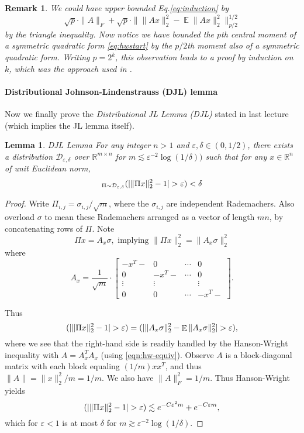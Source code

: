 \documentclass[11pt]{article}
\DeclareMathOperator*{\E}{\mathbb{E}}
\let\Pr\relax
\DeclareMathOperator*{\Pr}{\mathbb{P}}
\newcommand{\eps}{\varepsilon}
\newcommand{\R}{\mathbb{R}}
\newtheorem{remark}{Remark}
\newtheorem{lemma}[theorem]{Lemma}
\newcommand{\EquationName}[1]{\label{eq:#1}}
\newcommand{\Equation}[1]{Eq.\:\eqref{eq:#1}}
\newcommand{\Eqsub}[1]{\eqref{eq:#1}}
\begin{document}
\begin{remark}
\textup{
We could have upper bounded \Equation{induction} by 
$$
\sqrt{p}\cdot \|A\|_F + \sqrt{p}\cdot \| \|Ax\|_2^2 - \E\|Ax\|_2^2\|_{p/2}^{1/2}
$$
by the triangle inequality. Now notice we have bounded the $p$th central moment of a symmetric quadratic form \Eqsub{hwstart} by the $p/2$th moment also of a symmetric quadratic form. Writing $p = 2^k$, this observation leads to a proof by induction on $k$, which was the approach used in \cite{DiakonikolasKN10}.
}
\end{remark}

\paragraph{Distributional Johnson-Lindenstrauss (DJL) lemma}

Now we finally prove the {\it Distributional JL Lemma (DJL)} stated in last lecture (which implies the JL lemma itself).

\begin{lemma}{DJL Lemma}
For any integer $n > 1$ and $\eps,\delta\in (0, 1/2)$, there exists a distribution $\mathcal{D}_{\eps, \delta}$ over $\R^{m\times n}$ for $m \lesssim \eps^{-2}\log(1/\delta))$ such that for any $x\in\R^n$ of unit Euclidean norm,
$$
\Pr_{\Pi\sim\mathcal{D}_{\eps,\delta}}(| \|\Pi x\|_2^2 - 1 | > \eps ) < \delta
$$
\end{lemma}
\begin{proof}
Write $\Pi_{i,j} = \sigma_{i,j}/\sqrt{m}$, where the $\sigma_{i,j}$ are independent Rademachers. Also overload  $\sigma$ to mean these Rademachers arranged as a vector of length $mn$, by concatenating rows of $\Pi$. Note 
$$
\Pi x = A_x\sigma,\text{ implying }\|\Pi x\|_2^2 = \|A_x\sigma\|_2^2
$$
where
\begin{equation}
A_x = \frac 1{\sqrt{m}}\cdot \begin{bmatrix} 
- x^T - & 0 & \cdots & 0\\
0 & - x^T - & \cdots & 0\\
\vdots &\vdots &  &\vdots\\
0&0&\cdots& - x^T -
\end{bmatrix} . \EquationName{xmatrix}
\end{equation}

Thus
$$
\Pr(| \|\Pi x\|_2^2 - 1| > \eps) = \Pr(| \|A_x\sigma\|_2^2 - \E \|A_x\sigma\|_2^2 | > \eps) ,
$$
where we see that the right-hand side is readily handled by the Hanson-Wright inequality with $A = A_x^T A_x$ (using \eqref{eqn:hw-equiv}). Observe $A$ is a block-diagonal matrix with each block equaling $(1/m)xx^T$, and thus $\|A\| = \|x\|_2^2 / m = 1/m$. We also have $\|A\|_F^2 = 1/m$. Thus Hanson-Wright yields
$$
\Pr(| \|\Pi x\|_2 ^2 - 1| > \eps) \lesssim e^{-C\eps^2 m} + e^{-C\eps m} ,
$$
which for $\eps < 1$ is at most $\delta$ for $m \gtrsim \eps^{-2}\log(1/\delta)$.
\end{proof}



\end{document}
